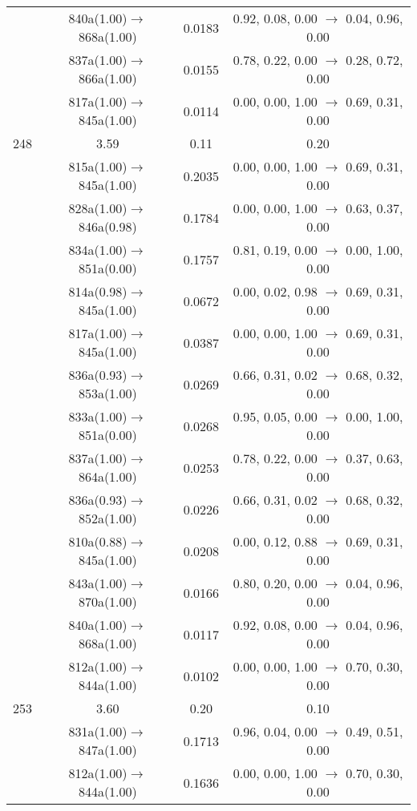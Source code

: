 \documentclass[10pt,a4paper]{article}
\begin{document}
\begin{longtable}{c|c|c|c}
 	& 840a(1.00)$\rightarrow$868a(1.00) &	 0.0183 &	 0.92, 0.08, 0.00 $\rightarrow$ 0.04, 0.96, 0.00 \\ 
 	& 837a(1.00)$\rightarrow$866a(1.00) &	 0.0155 &	 0.78, 0.22, 0.00 $\rightarrow$ 0.28, 0.72, 0.00 \\ 
 	& 817a(1.00)$\rightarrow$845a(1.00) &	 0.0114 &	 0.00, 0.00, 1.00 $\rightarrow$ 0.69, 0.31, 0.00 \\ 
 \hline248 &	 3.59 &	 0.11 &	 0.20 \\ 
  	& 815a(1.00)$\rightarrow$845a(1.00) &	 0.2035 &	 0.00, 0.00, 1.00 $\rightarrow$ 0.69, 0.31, 0.00 \\ 
 	& 828a(1.00)$\rightarrow$846a(0.98) &	 0.1784 &	 0.00, 0.00, 1.00 $\rightarrow$ 0.63, 0.37, 0.00 \\ 
 	& 834a(1.00)$\rightarrow$851a(0.00) &	 0.1757 &	 0.81, 0.19, 0.00 $\rightarrow$ 0.00, 1.00, 0.00 \\ 
 	& 814a(0.98)$\rightarrow$845a(1.00) &	 0.0672 &	 0.00, 0.02, 0.98 $\rightarrow$ 0.69, 0.31, 0.00 \\ 
 	& 817a(1.00)$\rightarrow$845a(1.00) &	 0.0387 &	 0.00, 0.00, 1.00 $\rightarrow$ 0.69, 0.31, 0.00 \\ 
 	& 836a(0.93)$\rightarrow$853a(1.00) &	 0.0269 &	 0.66, 0.31, 0.02 $\rightarrow$ 0.68, 0.32, 0.00 \\ 
 	& 833a(1.00)$\rightarrow$851a(0.00) &	 0.0268 &	 0.95, 0.05, 0.00 $\rightarrow$ 0.00, 1.00, 0.00 \\ 
 	& 837a(1.00)$\rightarrow$864a(1.00) &	 0.0253 &	 0.78, 0.22, 0.00 $\rightarrow$ 0.37, 0.63, 0.00 \\ 
 	& 836a(0.93)$\rightarrow$852a(1.00) &	 0.0226 &	 0.66, 0.31, 0.02 $\rightarrow$ 0.68, 0.32, 0.00 \\ 
 	& 810a(0.88)$\rightarrow$845a(1.00) &	 0.0208 &	 0.00, 0.12, 0.88 $\rightarrow$ 0.69, 0.31, 0.00 \\ 
 	& 843a(1.00)$\rightarrow$870a(1.00) &	 0.0166 &	 0.80, 0.20, 0.00 $\rightarrow$ 0.04, 0.96, 0.00 \\ 
 	& 840a(1.00)$\rightarrow$868a(1.00) &	 0.0117 &	 0.92, 0.08, 0.00 $\rightarrow$ 0.04, 0.96, 0.00 \\ 
 	& 812a(1.00)$\rightarrow$844a(1.00) &	 0.0102 &	 0.00, 0.00, 1.00 $\rightarrow$ 0.70, 0.30, 0.00 \\ 
 \hline253 &	 3.60 &	 0.20 &	 0.10 \\ 
  	& 831a(1.00)$\rightarrow$847a(1.00) &	 0.1713 &	 0.96, 0.04, 0.00 $\rightarrow$ 0.49, 0.51, 0.00 \\ 
 	& 812a(1.00)$\rightarrow$844a(1.00) &	 0.1636 &	 0.00, 0.00, 1.00 $\rightarrow$ 0.70, 0.30, 0.00 \\ 

\end{longtable}
\end{document}
